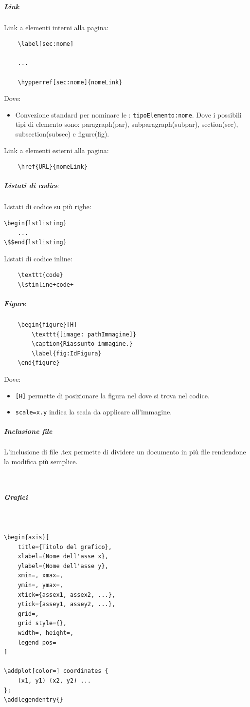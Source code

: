 \subparagraph{Link}
Link a elementi interni alla pagina:
\begin{lstlisting}
    \label[sec:nome]

    ... 

    \hypperref[sec:nome]{nomeLink}
\end{lstlisting}
Dove:
\begin{itemize}
    \item Convezione standard per nominare le : \texttt{tipoElemento:nome}.
    Dove i possibili tipi di elemento sono: paragraph(par), subparagraph(subpar), section(sec), subsection(subsec) e figure(fig).
\end{itemize}
\noindent Link a elementi esterni alla pagina:
\begin{lstlisting}
    \href{URL}{nomeLink}
\end{lstlisting}

\subparagraph{Listati di codice}
Listati di codice su più righe:
\begin{lstlisting}[mathescape=true]
\begin{lstlisting}
    ...
\$$end{lstlisting}
\end{lstlisting}
\noindent 
Listati di codice inline:
\begin{lstlisting}
    \texttt{code}
    \lstinline+code+
\end{lstlisting}

\subparagraph{Figure}
\begin{lstlisting}
    \begin{figure}[H]
        \texttt{[image: pathImmagine]}
        \caption{Riassunto immagine.}
        \label{fig:IdFigura}
    \end{figure}
\end{lstlisting}
Dove:
\begin{itemize}
    \item \texttt{[H]} permette di posizionare la figura nel  dove si trova nel codice.
    \item \texttt{scale=x.y} indica la scala da applicare all'immagine.
\end{itemize}

\subparagraph{Inclusione file}
L'inclusione di file .tex permette di dividere un documento in più file rendendone la modifica più semplice.
\begin{lstlisting}
    
\end{lstlisting} 

\subparagraph{Grafici}
\label{subpar:grafici}
\begin{lstlisting}


\begin{axis}[
    title={Titolo del grafico},
    xlabel={Nome dell'asse x}, 
    ylabel={Nome dell'asse y},
    xmin=, xmax=,  
    ymin=, ymax=,
    xtick={assex1, assex2, ...},
    ytick={assey1, assey2, ...},
    grid=, 
    grid style={},
    width=, height=, 
    legend pos= 
]

\addplot[color=] coordinates {
    (x1, y1) (x2, y2) ...
};
\addlegendentry{}

\end{lstlisting}

